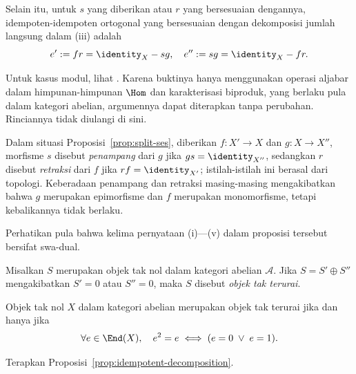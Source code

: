 \begin{proposisi}
	Selain itu, untuk $s$ yang diberikan atau $r$ yang bersesuaian dengannya,
	idempoten-idempoten ortogonal yang bersesuaian dengan dekomposisi jumlah
	langsung dalam (iii) adalah
	\[ e' := fr = \identity_X - sg, \quad e'' := sg = \identity_X - fr. \]
\end{proposisi}
\begin{bukti}
	Untuk kasus modul, lihat \cite[Proposisi 6.8.5]{Li1}. Karena buktinya hanya
	menggunakan operasi aljabar dalam himpunan-himpunan $\Hom$ dan karakterisasi
	biproduk, yang berlaku pula dalam kategori abelian, argumennya dapat
	diterapkan tanpa perubahan. Rinciannya tidak diulangi di sini.
\end{bukti}

Dalam situasi Proposisi~\ref{prop:split-ses}, diberikan $f:X'\to X$ dan
$g:X\to X''$, morfisme $s$ disebut \emph{penampang} dari $g$ jika
$gs=\identity_{X''}$, sedangkan $r$ disebut \emph{retraksi} dari $f$
jika $rf=\identity_{X'}$; istilah-istilah ini berasal dari topologi.
Keberadaan penampang dan retraksi masing-masing mengakibatkan bahwa $g$
merupakan epimorfisme dan $f$ merupakan monomorfisme, tetapi kebalikannya tidak
berlaku.

Perhatikan pula bahwa kelima pernyataan (i)---(v) dalam proposisi tersebut
bersifat swa-dual.

\begin{definisi}\label{def:indecomposable}
	Misalkan $S$ merupakan objek tak nol dalam kategori abelian $\mathcal{A}$.
	Jika $S=S'\oplus S''$ mengakibatkan $S'=0$ atau $S''=0$, maka $S$ disebut
	\emph{objek tak terurai}.
\end{definisi}

\begin{korolari}\label{prop:indecomposable-criterion}
	Objek tak nol $X$ dalam kategori abelian merupakan objek tak terurai jika
	dan hanya jika
	\[ \forall e \in \End(X), \quad e^2 = e \iff (e = 0 \;\vee\; e = 1). \]
\end{korolari}
\begin{bukti}
	Terapkan Proposisi~\ref{prop:idempotent-decomposition}.
\end{bukti}

